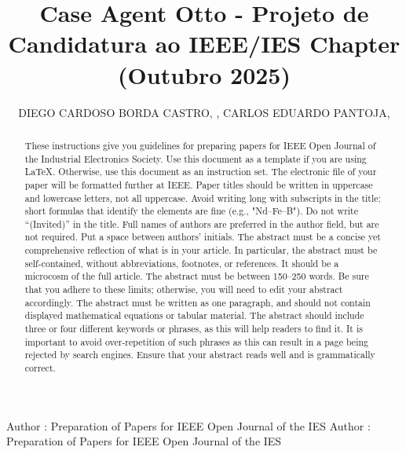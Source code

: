 \documentclass{ieeeojies}
\begin{document}
\title{Case Agent Otto - Projeto de Candidatura ao IEEE/IES Chapter (Outubro 2025)}
\author{\uppercase{Diego Cardoso Borda Castro}, ,
\uppercase{Carlos Eduardo Pantoja}, }
\address[1]{Federal Center For Technological Education (CEFET/RJ)}

\markboth
{Author \headeretal: Preparation of Papers for IEEE Open Journal of the IES}
{Author \headeretal: Preparation of Papers for IEEE Open Journal of the IES}


\begin{abstract}
These instructions give you guidelines for preparing papers for IEEE Open Journal of the Industrial Electronics Society. Use this document as a template if you are 
using \LaTeX. Otherwise, use this document as an 
instruction set. The electronic file of your paper will be formatted further at IEEE. Paper titles should be written in uppercase and lowercase letters, not all uppercase. Avoid writing long  with subscripts in the title; 
short formulas that identify the elements are fine (e.g., "Nd--Fe--B"). Do not write ``(Invited)'' in the title. Full names of authors are preferred in the author field, but are not required. Put a space between authors' initials. The abstract must be a concise yet comprehensive reflection of what is in your article. In particular, the abstract must be self-contained, without abbreviations, footnotes, or references. It should be a microcosm of the full article. The abstract must be between 150--250 words. Be sure that you adhere to these limits; otherwise, you will need to edit your abstract accordingly. The abstract must be written as one paragraph, and should not contain displayed mathematical equations or tabular material. The abstract 
should include three or four different keywords or phrases, as this will help readers to find it. It is important to avoid over-repetition of such phrases as this can result in a page being rejected by search engines. Ensure that your abstract reads well and is grammatically correct.
\end{abstract}
\end{document}
